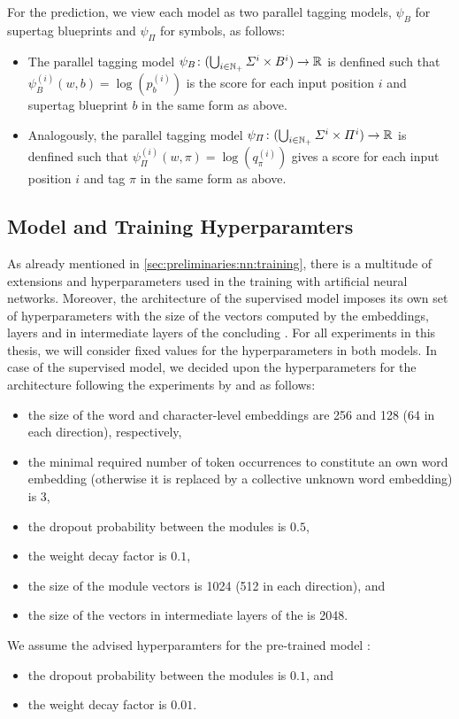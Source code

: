 \documentclass[../../document.tex]{subfiles}
\begin{document}
    For the prediction, we view each model as two parallel tagging models, \(\psi_B\) for supertag blueprints and \(\psi_\varPi\) for  symbols, as follows:
    \begin{itemize}
        \item The parallel tagging model \(\psi_B\colon (\bigcup_{i\in\mathbb{N}_+} \varSigma^i \times B^i) \to \mathbb{R}\) is denfined such that \(\psi_B^{(i)}(w, b) = \log(p_b^{(i)})\) is the score for each input position \(i\) and supertag blueprint \(b\) in the same form as above.
        \item Analogously, the parallel tagging model \(\psi_\varPi\colon (\bigcup_{i\in\mathbb{N}_+} \varSigma^i \times \varPi^i) \to \mathbb{R}\) is denfined such that \(\psi_\varPi^{(i)}(w, \pi) = \log(q_\pi^{(i)})\) gives a score for each input position \(i\) and  tag \(\pi\) in the same form as above.
    \end{itemize}

    \subsection*{Model and Training Hyperparamters}
    As already mentioned in \cref{sec:preliminaries:nn:training}, there is a multitude of extensions and hyperparameters used in the training with artificial neural networks.
    Moreover, the architecture of the supervised model imposes its own set of hyperparameters with the size of the vectors computed by the embeddings,  layers and in intermediate layers of the concluding .
    For all experiments in this thesis, we will consider fixed values for the hyperparameters in both models.
    In case of the supervised model, we decided upon the hyperparameters for the architecture following the experiments by \citet{Cor20} and \citet{StaSte20} as follows:
    \begin{itemize}
        \item the size of the word and character-level embeddings are 256 and 128 (64 in each direction), respectively,
        \item the minimal required number of token occurrences to constitute an own word embedding (otherwise it is replaced by a collective unknown word embedding) is 3,
        \item the dropout probability between the modules is \(0.5\),
        \item the weight decay factor is \(0.1\),
        \item the size of the  module vectors is 1024 (512 in each direction), and
        \item the size of the vectors in intermediate layers of the  is 2048.
    \end{itemize}
    We assume the advised hyperparamters for the pre-trained model \citep[cf.\@][]{Devlin2019}:
    \begin{itemize}
        \item the dropout probability between the modules is \(0.1\), and
        \item the weight decay factor is \(0.01\).
    \end{itemize}
\end{document}

